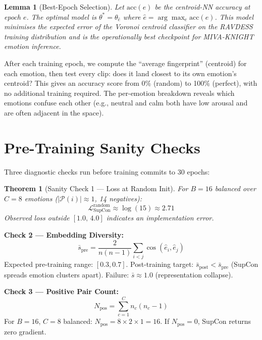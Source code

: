 \documentclass[12pt,a4paper]{article}
\theoremstyle{definition}
\theoremstyle{plain}
\newtheorem{theorem}{Theorem}[section]
\newtheorem{lemma}{Lemma}[section]
\theoremstyle{remark}
\begin{document}
\begin{lemma}[Best-Epoch Selection]
Let $\mathrm{acc}(e)$ be the centroid-NN accuracy at epoch $e$.
The optimal model is $\theta^* = \theta_{\hat{e}}$ where
$\hat{e} = \arg\max_e \mathrm{acc}(e)$.
This model minimises the expected error of the Voronoi centroid classifier
on the RAVDESS training distribution and is the operationally best checkpoint
for MIVA-KNIGHT emotion inference.
\end{lemma}

\begin{tcolorbox}[layman]
After each training epoch, we compute the ``average fingerprint'' (centroid)
for each emotion, then test every clip: does it land closest to its own
emotion's centroid?  This gives an accuracy score from 0\% (random) to
100\% (perfect), with no additional training required.
The per-emotion breakdown reveals which emotions confuse each other
(e.g., neutral and calm both have low arousal and are often adjacent in the space).
\end{tcolorbox}

\section{Pre-Training Sanity Checks}

Three diagnostic checks run before training commits to 30 epochs:

\begin{theorem}[Sanity Check 1 --- Loss at Random Init]
For $B=16$ balanced over $C=8$ emotions ($|\mathcal{P}(i)|\approx1$,
14 negatives):
\[
  \mathcal{L}_{\mathrm{SupCon}}^{\mathrm{random}} \approx \log(15) \approx 2.71
\]
Observed loss outside $[1.0,\,4.0]$ indicates an implementation error.
\end{theorem}

\textbf{Check 2 --- Embedding Diversity:}
\[
  \bar{s}_{\mathrm{pre}} = \frac{2}{n(n-1)}\sum_{i<j}\cos(\hat{e}_i,\hat{e}_j)
\]
Expected pre-training range: $[0.3, 0.7]$.
Post-training target: $\bar{s}_{\mathrm{post}} < \bar{s}_{\mathrm{pre}}$
(SupCon spreads emotion clusters apart).
Failure: $\bar{s}\approx1.0$ (representation collapse).

\textbf{Check 3 --- Positive Pair Count:}
\[
  N_{\mathrm{pos}} = \sum_{c=1}^{C} n_c(n_c-1)
\]
For $B=16$, $C=8$ balanced: $N_{\mathrm{pos}} = 8\times2\times1 = 16$.
If $N_{\mathrm{pos}}=0$, SupCon returns zero gradient.
\end{document}
